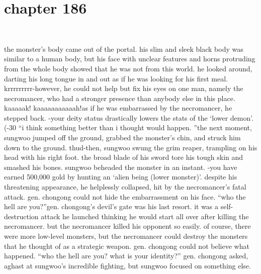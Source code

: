 \section{chapter 186}

                             




the monster’s body came out of the portal.
 his slim and sleek black body was similar to a human body, but his face with unclear features and horns protruding from the whole body showed that he was not from this world.
he looked around, darting his long tongue in and out as if he was looking for his first meal.
krrrrrrrrr-however, he could not help but fix his eyes on one man, namely the necromancer, who had a stronger presence than anybody else in this place.
kaaaaak! kaaaaaaaaaaah!as if he was embarrassed by the necromancer, he stepped back.
-your deity status drastically lowers the stats of the ‘lower demon’.
 (-30%
“i think something better than i thought would happen.
”the next moment, sungwoo jumped off the ground, grabbed the monster’s chin, and struck him down to the ground.
thud-then, sungwoo swung the grim reaper, trampling on his head with his right foot.
 the broad blade of his sword tore his tough skin and smashed his bones.
sungwoo beheaded the monster in an instant.
-you have earned 500,000 gold by hunting an ‘alien being (lower monster)’.
despite his threatening appearance, he helplessly collapsed, hit by the necromancer’s fatal attack.
 gen.
 chongong could not hide the embarrassment on his face.
“who the hell are you?”gen.
 chongong’s devil’s gate was his last resort.
 it was a self-destruction attack he launched thinking he would start all over after killing the necromancer.
but the necromancer killed his opponent so easily.
of course, there were more low-level monsters, but the necromancer could destroy the monsters that he thought of as a strategic weapon.
gen.
 chongong could not believe what happened.
“who the hell are you? what is your identity?” gen.
 chongong asked, aghast at sungwoo’s incredible fighting, but sungwoo focused on something else.

